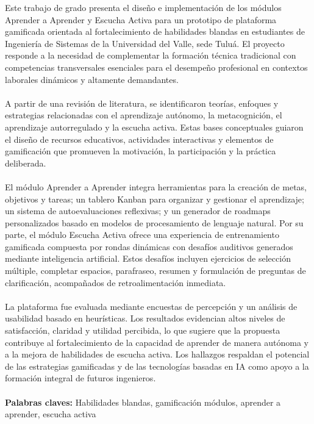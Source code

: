 Este trabajo de grado presenta el diseño e implementación de los módulos Aprender a Aprender y Escucha Activa para un prototipo de plataforma gamificada orientada al fortalecimiento de habilidades blandas en estudiantes de Ingeniería de Sistemas de la Universidad del Valle, sede Tuluá. El proyecto responde a la necesidad de complementar la formación técnica tradicional con competencias transversales esenciales para el desempeño profesional en contextos laborales dinámicos y altamente demandantes.
\\
\\
A partir de una revisión de literatura, se identificaron teorías, enfoques y estrategias relacionadas con el aprendizaje autónomo, la metacognición, el aprendizaje autorregulado y la escucha activa. Estas bases conceptuales guiaron el diseño de recursos educativos, actividades interactivas y elementos de gamificación que promueven la motivación, la participación y la práctica deliberada.
\\
\\
El módulo Aprender a Aprender integra herramientas para la creación de metas, objetivos y tareas; un tablero Kanban para organizar y gestionar el aprendizaje; un sistema de autoevaluaciones reflexivas; y un generador de roadmaps personalizados basado en modelos de procesamiento de lenguaje natural. Por su parte, el módulo Escucha Activa ofrece una experiencia de entrenamiento gamificada compuesta por rondas dinámicas con desafíos auditivos generados mediante inteligencia artificial. Estos desafíos incluyen ejercicios de selección múltiple, completar espacios, parafraseo, resumen y formulación de preguntas de clarificación, acompañados de retroalimentación inmediata.
\\
\\
La plataforma fue evaluada mediante encuestas de percepción y un análisis de usabilidad basado en heurísticas. Los resultados evidencian altos niveles de satisfacción, claridad y utilidad percibida, lo que sugiere que la propuesta contribuye al fortalecimiento de la capacidad de aprender de manera autónoma y a la mejora de habilidades de escucha activa. Los hallazgos respaldan el potencial de las estrategias gamificadas y de las tecnologías basadas en IA como apoyo a la formación integral de futuros ingenieros.
\\
\\
\textbf{Palabras claves:} Habilidades blandas, gamificación módulos, aprender a aprender, escucha activa